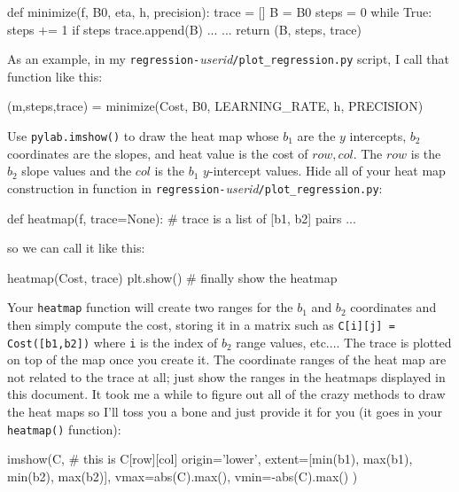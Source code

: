 \documentclass[titlepage]{tufte-book}
\begin{document}
\begin{fullwidth}
\begin{pyverbatim}
def minimize(f, B0, eta, h, precision):
    trace = []
    B = B0
    steps = 0 
    while True:
        steps += 1
        if steps %
            trace.append(B)
        ...     
    ... 
    return (B, steps, trace)
\end{pyverbatim}

\noindent As an example, in my {\tt regression-}{\em userid}{\tt /plot\_regression.py} script, I call that function like this:

\begin{pyverbatim}
(m,steps,trace) = minimize(Cost, B0, LEARNING_RATE, h, PRECISION)
\end{pyverbatim}

Use {\tt pylab.imshow()} to draw the heat map whose $b_1$ are the $y$ intercepts, $b_2$ coordinates are the slopes, and heat value is the cost of $row,col$. The $row$ is the $b_2$ slope values and the $col$ is the $b_1$ $y$-intercept values. Hide all of your heat map construction in function in {\tt regression-}{\em userid}{\tt /plot\_regression.py}:

\begin{pyverbatim}
def heatmap(f, trace=None): # trace is a list of [b1, b2] pairs
    ...
\end{pyverbatim}

\noindent so we can call it like this:

\begin{pyverbatim}
heatmap(Cost, trace)
plt.show() # finally show the heatmap
\end{pyverbatim}

Your {\tt heatmap} function will create two ranges for the $b_1$ and $b_2$ coordinates and then simply compute the cost, storing it in a matrix such as {\tt C[i][j] = Cost([b1,b2])} where {\tt i} is the index of $b_2$ range values, etc....  The trace is plotted on top of the map once you create it. The coordinate ranges of the heat map are not related to the trace at all; just show the ranges in the heatmaps displayed in this document. It took me a while to figure out all of the crazy methods to draw the heat maps so I'll toss you a bone and just provide it for you (it goes in your {\tt heatmap()} function):

\begin{pyverbatim}
	imshow(C,  # this is C[row][col]
		   origin='lower',
		   extent=[min(b1), max(b1), min(b2), max(b2)],
		   vmax=abs(C).max(), vmin=-abs(C).max()
	)
\end{pyverbatim}


\end{fullwidth}
\end{document}
